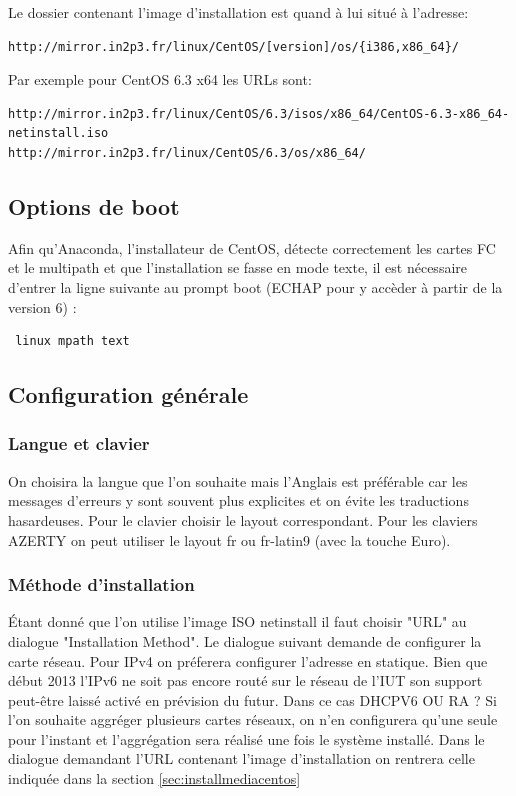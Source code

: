 \documentclass[a4paper,oneside]{report}
\begin{document}
\noindent Le dossier contenant l'image d'installation est quand à lui situé à l'adresse:
\begin{verbatim}
http://mirror.in2p3.fr/linux/CentOS/[version]/os/{i386,x86_64}/
\end{verbatim}

\noindent Par exemple pour CentOS 6.3 x64 les URLs sont:
\begin{verbatim}
http://mirror.in2p3.fr/linux/CentOS/6.3/isos/x86_64/CentOS-6.3-x86_64-netinstall.iso
http://mirror.in2p3.fr/linux/CentOS/6.3/os/x86_64/
\end{verbatim}


\subsection{Options de boot}
Afin qu'Anaconda, l'installateur de CentOS, détecte correctement les cartes FC et le multipath et que l'installation se fasse en mode texte, il est nécessaire d'entrer la ligne suivante au prompt boot (ECHAP pour y accèder à partir de la version 6) :
\begin{verbatim} linux mpath text \end{verbatim}

\subsection{Configuration générale}
\subsubsection{Langue et clavier}
On choisira la langue que l'on souhaite mais l'Anglais est préférable car les messages d'erreurs y sont souvent plus explicites et on évite les traductions hasardeuses.\newline
Pour le clavier choisir le layout correspondant. Pour les claviers AZERTY on peut utiliser le layout fr ou fr-latin9 (avec la touche Euro).

\subsubsection{Méthode d'installation}
Étant donné que l'on utilise l'image ISO netinstall il faut choisir "URL" au dialogue "Installation Method".
Le dialogue suivant demande de configurer la carte réseau.
Pour IPv4 on préferera configurer l'adresse en statique.
Bien que début 2013 l'IPv6 ne soit pas encore routé sur le réseau de l'IUT son support peut-être laissé activé en prévision du futur.
Dans ce cas DHCPV6 OU RA ?\newline
Si l'on souhaite aggréger plusieurs cartes réseaux, on n'en configurera qu'une seule pour l'instant et l'aggrégation sera réalisé une fois le système installé.\newline
Dans le dialogue demandant l'URL contenant l'image d'installation on rentrera celle indiquée dans la section \ref{sec:installmediacentos}
\end{document}
